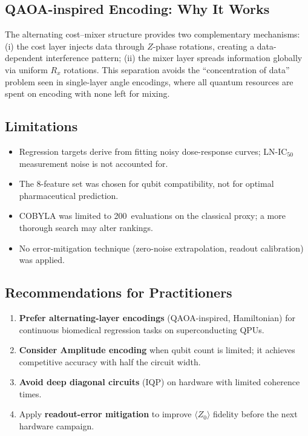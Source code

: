 \documentclass[twocolumn,aps,pra,superscriptaddress,floatfix]{revtex4-2}
\newcommand{\cobyla}{\textsc{COBYLA}}
\newcommand{\expvz}{\ensuremath{\langle Z_0 \rangle}}
\begin{document}
\subsection{QAOA-inspired Encoding: Why It Works}

The alternating cost--mixer structure provides two complementary mechanisms:
(i) the cost layer injects data through $Z$-phase rotations, creating a
data-dependent interference pattern; (ii) the mixer layer spreads information
globally via uniform $R_x$ rotations.
This separation avoids the ``concentration of data'' problem seen in
single-layer angle encodings, where all quantum resources are spent on
encoding with none left for mixing.

\subsection{Limitations}

\begin{itemize}
  \item Regression targets derive from fitting noisy dose-response curves;
        LN-IC$_{50}$ measurement noise is not accounted for.
  \item The 8-feature set was chosen for qubit compatibility, not for
        optimal pharmaceutical prediction.
  \item \cobyla{} was limited to 200~evaluations on the classical proxy;
        a more thorough search may alter rankings.
  \item No error-mitigation technique (zero-noise extrapolation, readout
        calibration) was applied.
\end{itemize}

\subsection{Recommendations for Practitioners}

\begin{enumerate}
  \item \textbf{Prefer alternating-layer encodings} (QAOA-inspired,
        Hamiltonian) for continuous biomedical regression tasks on
        superconducting QPUs.
  \item \textbf{Consider Amplitude encoding} when qubit count is limited;
        it achieves competitive accuracy with half the circuit width.
  \item \textbf{Avoid deep diagonal circuits} (IQP) on hardware with
        limited coherence times.
  \item Apply \textbf{readout-error mitigation} to improve $\expvz$
        fidelity before the next hardware campaign.
\end{enumerate}
\end{document}
